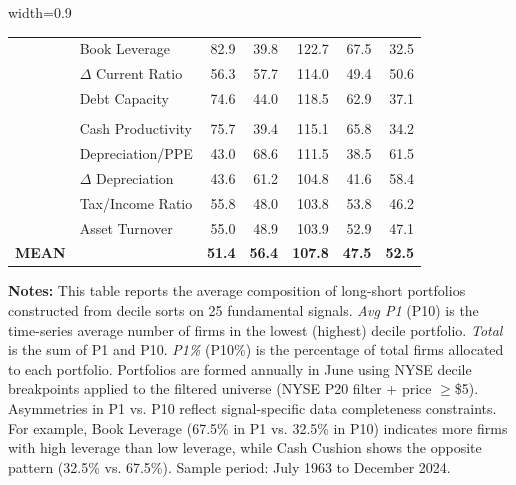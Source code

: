 \begin{table}[htbp]
\begin{adjustbox}{width=0.9\linewidth}
\begin{tabular}{l l*{5}{r}}
 & Book Leverage & 82.9 & 39.8 & 122.7 & 67.5 & 32.5 \\
 & $\Delta$ Current Ratio & 56.3 & 57.7 & 114.0 & 49.4 & 50.6 \\
 & Debt Capacity & 74.6 & 44.0 & 118.5 & 62.9 & 37.1 \\
\addlinespace
\multicolumn{7}{l}{\textit{Panel E: Operating Efficiency}} \\
 & Cash Productivity & 75.7 & 39.4 & 115.1 & 65.8 & 34.2 \\
 & Depreciation/PPE & 43.0 & 68.6 & 111.5 & 38.5 & 61.5 \\
 & $\Delta$ Depreciation & 43.6 & 61.2 & 104.8 & 41.6 & 58.4 \\
 & Tax/Income Ratio & 55.8 & 48.0 & 103.8 & 53.8 & 46.2 \\
 & Asset Turnover & 55.0 & 48.9 & 103.9 & 52.9 & 47.1 \\
\midrule
\textbf{MEAN} & & \textbf{51.4} & \textbf{56.4} & \textbf{107.8} & \textbf{47.5} & \textbf{52.5} \\
\bottomrule
\end{tabular}
\end{adjustbox}

\medskip

\begin{minipage}{\textwidth}
\footnotesize
\textbf{Notes:} This table reports the average composition of long-short portfolios constructed from decile sorts on 25 fundamental signals. \textit{Avg P1} (P10) is the time-series average number of firms in the lowest (highest) decile portfolio. \textit{Total} is the sum of P1 and P10. \textit{P1\%} (P10\%) is the percentage of total firms allocated to each portfolio. Portfolios are formed annually in June using NYSE decile breakpoints applied to the filtered universe (NYSE P20 filter + price $\geq$\$5). Asymmetries in P1 vs. P10 reflect signal-specific data completeness constraints. For example, Book Leverage (67.5\% in P1 vs. 32.5\% in P10) indicates more firms with high leverage than low leverage, while Cash Cushion shows the opposite pattern (32.5\% vs. 67.5\%). Sample period: July 1963 to December 2024.
\end{minipage}

\end{table}
